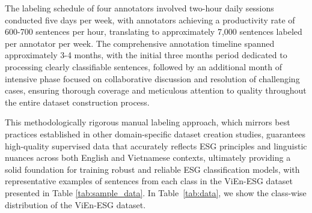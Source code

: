 \documentclass[12pt, letterpaper]{template}
\begin{document}

The labeling schedule of four annotators involved two-hour daily sessions conducted five days per week, with annotators achieving a productivity rate of 600-700 sentences per hour, translating to approximately 7,000 sentences labeled per annotator per week. The comprehensive annotation timeline spanned approximately 3-4 months, with the initial three months period dedicated to processing clearly classifiable sentences, followed by an additional month of intensive phase focused on collaborative discussion and resolution of challenging cases, ensuring thorough coverage and meticulous attention to quality throughout the entire dataset construction process. 

This methodologically rigorous manual labeling approach, which mirrors best practices established in other domain-specific dataset creation studies, guarantees high-quality supervised data that accurately reflects ESG principles and linguistic nuances across both English and Vietnamese contexts, ultimately providing a solid foundation for training robust and reliable ESG classification models, with representative examples of sentences from each class in the ViEn-ESG dataset presented in Table \ref{tab:sample_data}. In Table~\ref{tab:data}, we show the class-wise distribution of the ViEn-ESG dataset.



\begin{table}[h]
\caption{Class-wise distribution of ViEn-ESG Dataset.}
\label{tab:data}
\centering
{}
\end{table}
\end{document}
